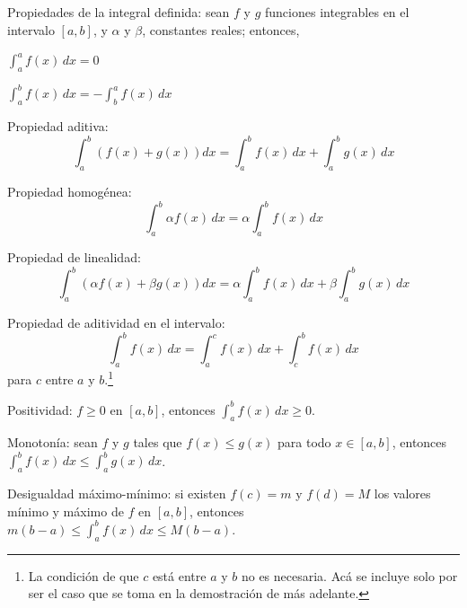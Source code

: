 \begin{teorema}\label{PropIntegral}
Propiedades de la integral definida: sean $f$ y $g$ funciones integrables en el intervalo $[a,b]$, y $\alpha$ y $\beta$, constantes reales; entonces,
\begin{parrafonumerado}
\item $\int_{a}^{a}f\left( x\right)\,dx=0$
\item $\int_{a}^{b}f\left( x\right)\,dx=-\int_{b}^{a}f\left( x\right)\,dx$

\item Propiedad aditiva:
\[
  \int_{a}^{b}\left( f(x)+g(x)\right)dx=\int_{a}^{b}f(x)\,dx+\int_{a}^{b}g(x)\,dx
\]

\item Propiedad homogénea:
\[\int_{a}^{b}\alpha f(x)\,dx=\alpha \int_{a}^{b}f(x)\,dx\]
\item Propiedad de linealidad:
\[\int_{a}^{b}\left( \alpha f(x)+\beta g(x)\right) dx=\alpha \int_{a}^{b}f(x)\,dx+\beta \int_{a}^{b}g(x)\,dx\]
\item Propiedad de aditividad en el intervalo:
\[\int_{a}^{b}f(x)\,dx=\int_{a}^{c}f(x)\,dx+\int_{c}^{b}f(x)\,dx\]
para $c$ entre $a$ y $b$.\footnote{La condición de que $c$ está entre $a$ y $b$ no es necesaria. Acá se incluye solo por ser el caso que se toma en la demostración de más adelante.}
\item Positividad: $f\geq 0$ en $[a,b]$, entonces $\int_{a}^{b}f(x)\,dx\geq 0$.
\item Monotonía: sean $f$ y $g$ tales que $f\left( x\right)\leq g\left( x\right)$ para todo $x\in \left[ a,b\right]$, entonces $\int_{a}^{b}f(x)\,dx\leq \int_{a}^{b}g(x)\,dx$.
\item Desigualdad máximo-mínimo: si existen $f(c)=m $ y $f(d)=M$ los valores mínimo y máximo de $f$ en $[a,b]$, entonces $m(b-a)\leq \int_{a}^{b}f(x)\,dx\leq M(b-a)$.
\end{parrafonumerado}
\end{teorema}


